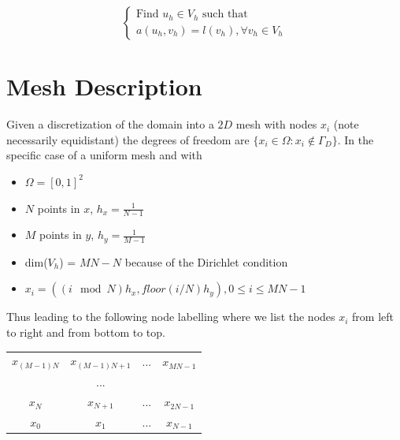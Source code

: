 \documentclass[a4paper]{report}
\begin{document}
\begin{equation}\label{eq:3}
\left\{
\begin{array}{l}
\text{Find $u_h \in V_h$ such that}\\
a(u_h,v_h)=l(v_h), \forall v_h \in V_h
\end{array}
\right.
\end{equation}

\section{Mesh Description}
Given a discretization of the domain into a $2D$ mesh with nodes $x_{i}$ (note necessarily equidistant) the degrees of freedom are $\{ x_{i} \in \Omega : x_{i} \not\in \Gamma_D \}$.
In the specific case of a uniform mesh and with
\begin{itemize}
\item $\Omega=[0,1]^2$
\item $N$ points in $x$, $h_x=\frac{1}{N-1}$ 
\item $M$ points in $y$, $h_y=\frac{1}{M-1}$
\item dim($V_h$) = $MN-N$ because of the Dirichlet condition
\item $x_i=((i\mod N)h_x,floor(i/N)h_y),0\leq i\leq MN-1$
\end{itemize} 


Thus leading to the following node labelling where we list the nodes $x_i$ from left to right and from bottom to top.

\begin{center}
\begin{tabular}{cccc}
$x_{(M-1)N}$ &$ x_{(M-1)N +1}$ & ... &$x_{MN-1}$\\
& ...& &\\
$x_N $& $x_{N+1}$ & ... &$x_{2N-1}$\\
$x_0$ &$ x_1$ &... &$x_{N-1}$
\end{tabular}
\end{center}
\end{document}

